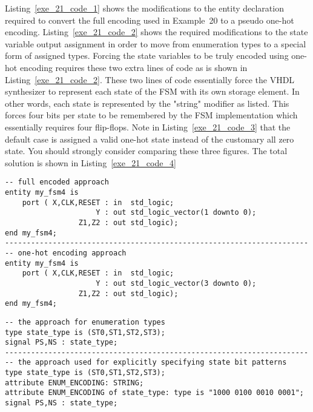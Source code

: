 Listing~\ref{exe_21_code_1} shows the modifications to the entity declaration required to convert the full encoding used in Example~20 to a pseudo one-hot encoding. Listing~\ref{exe_21_code_2} shows the required modifications to the state variable output assignment in order to move from enumeration types to a special form of assigned types. Forcing the state variables to be truly encoded using one-hot encoding requires these two extra lines of code as is shown in Listing~\ref{exe_21_code_2}. These two lines of code essentially force the VHDL synthesizer to represent each state of the FSM with its own storage element. In other words, each state is represented by the "string" modifier as listed. This forces four bits per state to be remembered by the FSM implementation which essentially requires four flip-flops. Note in Listing~\ref{exe_21_code_3} that the default case is assigned a valid one-hot state instead of the customary all zero state. You should strongly consider comparing these three figures. The total solution is shown in Listing~\ref{exe_21_code_4} 

\noindent
\begin{minipage}{0.99\linewidth}
\begin{lstlisting}[label=exe_21_code_1, caption=Modifications to convert Example~20 to one-hot encoding.]
-- full encoded approach
entity my_fsm4 is 
    port ( X,CLK,RESET : in  std_logic; 
                     Y : out std_logic_vector(1 downto 0); 
                 Z1,Z2 : out std_logic);  
end my_fsm4;
----------------------------------------------------------------------
-- one-hot encoding approach
entity my_fsm4 is 
    port ( X,CLK,RESET : in  std_logic; 
                     Y : out std_logic_vector(3 downto 0); 
                 Z1,Z2 : out std_logic);  
end my_fsm4;
\end{lstlisting}

\begin{lstlisting}[label=exe_21_code_2, caption=Modifications to convert state variables to use one-hot encoding.]
-- the approach for enumeration types   
type state_type is (ST0,ST1,ST2,ST3); 
signal PS,NS : state_type; 
----------------------------------------------------------------------
-- the approach used for explicitly specifying state bit patterns
type state_type is (ST0,ST1,ST2,ST3); 
attribute ENUM_ENCODING: STRING; 
attribute ENUM_ENCODING of state_type: type is "1000 0100 0010 0001";
signal PS,NS : state_type;
\end{lstlisting}
\end{minipage}

